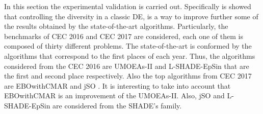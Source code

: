 In this section the experimental validation is carried out.
%
Specifically is showed that controlling the diversity in a classic DE, is a way to improve further some of the results obtained by the state-of-the-art algorithms.
%
Particularly, the benchmarks of CEC 2016 and CEC 2017 are considered, each one of them is composed of thirty different problems.
%
The state-of-the-art is conformed by the algorithms that correspond to the first places of each year.
%
Thus, the algorithms considered from the CEC 2016 are UMOEAs-II \cite{elsayed2016testing} and L-SHADE-EpSin \cite{awad2016ensemble} that are the first and second place respectively.
%
Also the top algorithms from CEC 2017 are EBOwithCMAR \cite{kumar2017improving} and jSO \cite{brest2017single}.
%
It is interesting to take into account that EBOwithCMAR is an improvement of the UMOEAs-II.
%
Also, jSO and L-SHADE-EpSin are considered from the SHADE's family.


